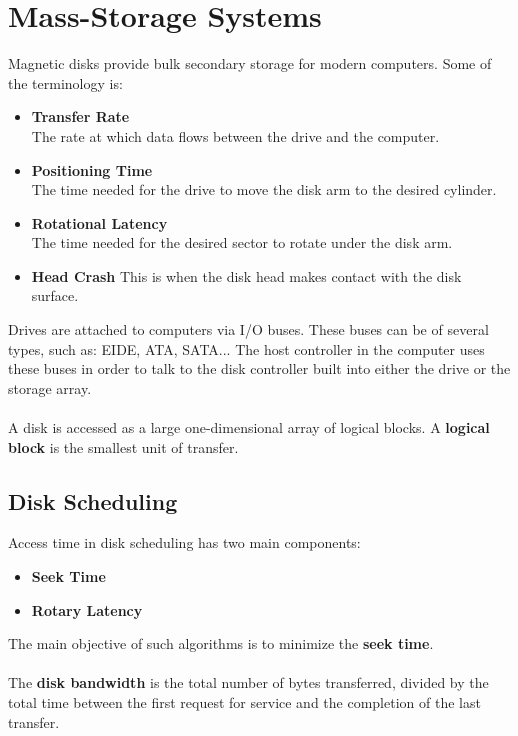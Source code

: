 \documentclass{article}
\begin{document}
\section{Mass-Storage Systems}
Magnetic disks provide bulk secondary storage for modern computers. Some of the terminology is:

\begin{itemize}
	\item \textbf{Transfer Rate}
	\vspace{.2cm} \\
	The rate at which data flows between the drive and the computer.
	
	\item \textbf{Positioning Time}
	\vspace{.2cm} \\
	The time needed for the drive to move the disk arm to the desired cylinder.
	
	\item \textbf{Rotational Latency}
	\vspace{.2cm} \\
	The time needed for the desired sector to rotate under the disk arm.
	
	\item \textbf{Head Crash}
	This is when the disk head makes contact with the disk surface.
\end{itemize}
Drives are attached to computers via I/O buses. These buses can be of several types, such as: EIDE, ATA, SATA... The host controller in the computer uses these buses in order to talk to the disk controller built into either the drive or the storage array. \\ \\
A disk is accessed as a large one-dimensional array of logical blocks. A \textbf{logical block} is the smallest unit of transfer.

\subsection{Disk Scheduling}
Access time in disk scheduling has two main components:

\begin{itemize}
	\item \textbf{Seek Time}
	\item \textbf{Rotary Latency}
\end{itemize}
The main objective of such algorithms is to minimize the \textbf{seek time}. \\ \\
The \textbf{disk bandwidth} is the total number of bytes transferred, divided by the total time between the first request for service and the completion of the last transfer.
\end{document}
